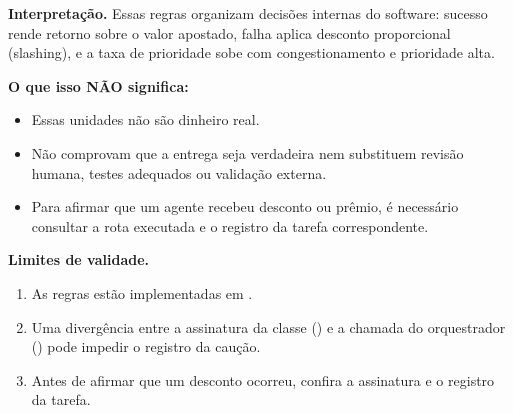 \begin{descricao}
\textbf{Interpretação.} Essas regras organizam decisões internas do software: sucesso rende retorno sobre o valor apostado, falha aplica desconto proporcional (slashing), e a taxa de prioridade sobe com congestionamento e prioridade alta.

\textbf{O que isso NÃO significa:}
\begin{itemize}[leftmargin=1.3em,itemsep=1pt]
  \item Essas unidades não são dinheiro real.
  \item Não comprovam que a entrega seja verdadeira nem substituem revisão humana, testes adequados ou validação externa.
  \item Para afirmar que um agente recebeu desconto ou prêmio, é necessário consultar a rota executada e o registro da tarefa correspondente.
\end{itemize}
\end{descricao}

\begin{aviso}
\textbf{Limites de validade.}
\begin{enumerate}[leftmargin=1.3em,itemsep=1pt]
  \item As regras estão implementadas em .
  \item Uma divergência entre a assinatura da classe () e a chamada do orquestrador () pode impedir o registro da caução.
  \item Antes de afirmar que um desconto ocorreu, confira a assinatura e o registro da tarefa.
\end{enumerate}
\end{aviso}

